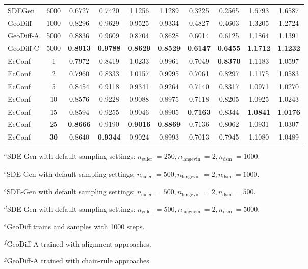 \documentclass{article} %
\begin{document}
\begin{table}[htbp]
\begin{threeparttable}
\begin{tabular}{l|c|cccc|cccc}
			SDEGen\tnote{$d$}  & 6000 &        0.6727  & 0.7420  & 1.1256  & 1.1289  & 0.3225  & 0.2565  & 1.6793  & 1.6587  \\
			GeoDiff\tnote{$e$}  & 1000  &        0.8296  & 0.9629  & 0.9525  & 0.9334  & 0.4827  & 0.4603  & 1.3205  & 1.2724  \\
			GeoDiff-A\tnote{$f$} & 5000  &      0.8836  & 0.9609  & 0.8704  & 0.8628  & 0.6014  & 0.6125  & 1.1864  & 1.1391  \\
			GeoDiff-C\tnote{$g$}  & 5000  &      \textbf{0.8913 } & \textbf{0.9788 } & \textbf{0.8629 } & \textbf{0.8529 } & \textbf{0.6147 } & \textbf{0.6455 } & \textbf{1.1712 } & \textbf{1.1232 } \\
			\midrule
			EcConf & 1     &       0.7972  & 0.8419  & 1.0233  & 0.9961  & 0.7049  & \textbf{0.8370 } & 1.1183  & 1.0597  \\
			EcConf & 2     &       0.7960  & 0.8333  & 1.0157  & 0.9995  & 0.7061  & 0.8297  & 1.1175  & 1.0583  \\
			EcConf & 5     &       0.8454  & 0.9118  & 0.9341  & 0.9264  & 0.7140  & 0.8317  & 1.0971  & 1.0270  \\
			EcConf & 10    &       0.8576  & 0.9228  & 0.9088  & 0.8975  & 0.7118  & 0.8205  & 1.0925  & 1.0243  \\
			EcConf & 15    &       0.8594  & 0.9255  & 0.9046  & 0.8905  & \textbf{0.7163 } & 0.8344  & \textbf{1.0841 } & \textbf{1.0176 } \\
			EcConf & 25    &       \textbf{0.8666 } & 0.9190  & \textbf{0.9016 } & \textbf{0.8869 } & 0.7136  & 0.8062  & 1.0931  & 1.0307  \\
			EcConf & \textbf{30} & 0.8640  & \textbf{0.9344 } & 0.9024  & 0.8993  & 0.7013  & 0.7945  & 1.1080  & 1.0489  \\
			\bottomrule
		\end{tabular}%
		
		\begin{tablenotes}
			\footnotesize
			\item$^a$SDE-Gen with default sampling settings: $n_{\text {euler }}=250, n_{\text {langevin }}=2, n_{\text {dsm }}=1000$.
			\item$^b$SDE-Gen with default sampling settings: $n_{\text {euler }}=500, n_{\text {langevin }}=2, n_{\text {dsm }}=1000$.
			\item$^c$SDE-Gen with default sampling settings: $n_{\text {euler }}=500, n_{\text {langevin }}=2, n_{\text {dsm }}=500$.
			\item$^d$SDE-Gen with default sampling settings: $n_{\text {euler }}=500, n_{\text {langevin }}=2, n_{\text {dsm }}=5000$.
			\item$^e$GeoDiff trains and samples with 1000 steps.
			\item$^f$GeoDiff-A trained with alignment approaches.
			\item$^g$GeoDiff-A trained with chain-rule approaches.
		\end{tablenotes}
	\end{threeparttable}
	
	\label{tab3}%
\end{table}%
\end{document}
